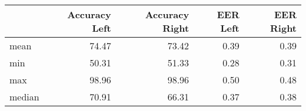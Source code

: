 \begin{tabular}{lrrrr}
\toprule
{} &  Accuracy Left &  Accuracy Right &  EER Left &  EER Right \\
\midrule
mean   &          74.47 &           73.42 &      0.39 &       0.39 \\
min    &          50.31 &           51.33 &      0.28 &       0.31 \\
max    &          98.96 &           98.96 &      0.50 &       0.48 \\
median &          70.91 &           66.31 &      0.37 &       0.38 \\
\bottomrule
\end{tabular}
